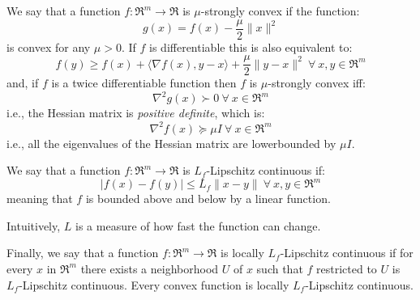 
\begin{definition} \label{def:strong_convexity}
We say that a function $f: \Re^m \rightarrow \Re$ is $\mu$-strongly convex if the function:
$$
g(x) = f(x) - \frac{\mu}{2} \| x \|^2
$$
is convex for any $\mu > 0$. 
If $f$ is differentiable this is also equivalent to:
$$
f(y) \geq f(x) + \langle \nabla f(x), y - x \rangle + \frac{\mu}{2} \| y - x \|^2 \ \forall \ x, y \in \Re^m
$$
and, if $f$ is a twice differentiable function then $f$ is $\mu$-strongly convex iff:
$$
\nabla^2 g(x) \succ 0 \ \forall \ x \in \Re^m
$$
i.e., the Hessian matrix is \emph{positive definite}, which is:
$$
\nabla^2 f(x) \succeq \mu I \ \forall \ x \in \Re^m
$$
i.e., all the eigenvalues of the Hessian matrix are lowerbounded by $\mu I$.
\end{definition}


\begin{definition} \label{def:l_f_lipschitz_continuity}
We say that a function $f: \Re^m \rightarrow \Re$ is $L_f$-Lipschitz continuous if:
$$
| f(x) - f(y) | \leq L_f \| x - y \| \ \forall \ x, y \in \Re^m
$$
meaning that $f$ is bounded above and below by a linear function.

Intuitively, $L$ is a measure of how fast the function can change.

Finally, we say that a function $f: \Re^m \rightarrow \Re$ is locally $L_f$-Lipschitz continuous if for every $x$ in $\Re^m$ there exists a neighborhood $U$ of $x$ such that $f$ restricted to $U$ is $L_f$-Lipschitz continuous.
Every convex function is locally $L_f$-Lipschitz continuous.
\end{definition}

